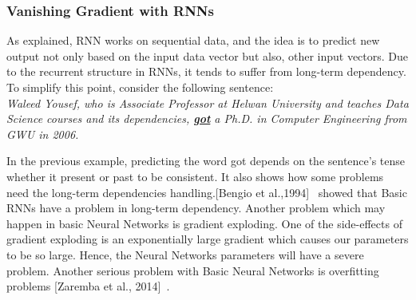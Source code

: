  \subsubsection{Vanishing Gradient with RNNs}\label{Sec:RNN_Vanishing}
 
As explained, RNN works on sequential data, and the idea is to predict new output not only based on the input data vector but also, other input vectors. Due to the recurrent structure in RNNs, it tends to suffer from long-term dependency. To simplify this point, consider the following sentence:\\
\textit{Waleed Yousef, who is Associate Professor at Helwan University and teaches Data Science courses and its dependencies, \textbf{\underline{got}} a Ph.D. in Computer Engineering from GWU in 2006.}

 In the previous example, predicting the word got depends on the sentence’s tense whether it present or past to be consistent. It also shows how some problems need the long-term dependencies handling.[Bengio et al.,1994]~\cite{Bengio_1994} showed that Basic RNNs have a problem in long-term dependency.  Another problem which may happen in basic Neural Networks is gradient exploding. One of the side-effects of gradient exploding is an exponentially large gradient which causes our parameters to be so large. Hence, the Neural Networks parameters will have a severe problem. Another serious problem with Basic Neural Networks is overfitting problems [Zaremba et al., 2014]~\cite{Zaremba_et_al}.


